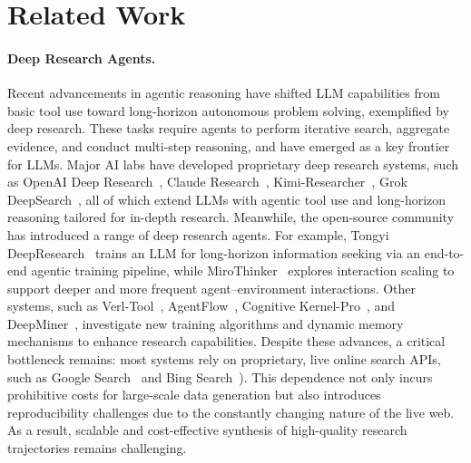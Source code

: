 \section{Related Work}
\paragraph{Deep Research Agents.}

Recent advancements in agentic reasoning have shifted LLM capabilities from basic tool use toward long-horizon autonomous problem solving, exemplified by deep research. These tasks require agents to perform iterative search, aggregate evidence, and conduct multi-step reasoning, and have emerged as a key frontier for LLMs. Major AI labs have developed proprietary deep research systems, such as OpenAI Deep Research~\citep{openai2025deepresearch}, Claude Research~\citep{anthropic2025claude_research}, Kimi-Researcher~\citep{moonshot2025kimi_researcher}, Grok DeepSearch~\citep{xai2025grok3}, all of which extend LLMs with agentic tool use and long-horizon reasoning tailored for in-depth research. 
Meanwhile, the open-source community has introduced a range of deep research agents. For example, Tongyi DeepResearch~\citep{team2025tongyideepresearch} trains an LLM for long-horizon information seeking via an end-to-end agentic training pipeline, while MiroThinker~\citep{miromind2025mirothinker} explores interaction scaling to support deeper and more frequent agent–environment interactions. Other systems, such as Verl-Tool~\citep{jiang2025verltool}, AgentFlow~\citep{li2025agentflow}, Cognitive Kernel-Pro~\citep{fang2025cognitive}, and DeepMiner~\citep{tang2025beyond}, investigate new training algorithms and dynamic memory mechanisms to enhance research capabilities.
Despite these advances, a critical bottleneck remains: most systems rely on proprietary, live online search APIs, such as Google Search~\citep{google_search_api} and Bing Search~\citep{bing_search_api}). This dependence not only incurs prohibitive costs for large-scale data generation but also introduces reproducibility challenges due to the constantly changing nature of the live web. As a result, scalable and cost-effective synthesis of high-quality research trajectories remains challenging.


